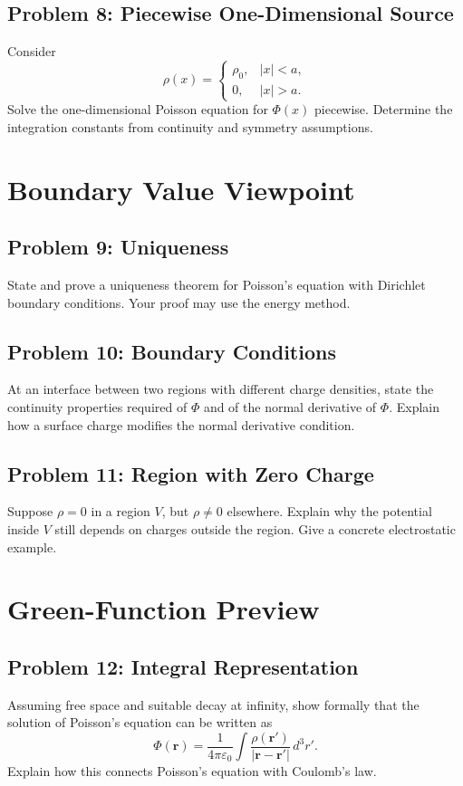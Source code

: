 \documentclass[hidelinks]{article}
\begin{document}
\subsection{Problem 8: Piecewise One-Dimensional Source}
Consider
\[
\rho(x)=
\begin{cases}
\rho_0, & |x|<a,\\
0, & |x|>a.
\end{cases}
\]
Solve the one-dimensional Poisson equation for $\Phi(x)$ piecewise. Determine the integration constants from continuity and symmetry assumptions.

\section{Boundary Value Viewpoint}
\subsection{Problem 9: Uniqueness}
State and prove a uniqueness theorem for Poisson's equation with Dirichlet boundary conditions. Your proof may use the energy method.

\subsection{Problem 10: Boundary Conditions}
At an interface between two regions with different charge densities, state the continuity properties required of $\Phi$ and of the normal derivative of $\Phi$. Explain how a surface charge modifies the normal derivative condition.

\subsection{Problem 11: Region with Zero Charge}
Suppose $\rho=0$ in a region $V$, but $\rho\neq 0$ elsewhere. Explain why the potential inside $V$ still depends on charges outside the region. Give a concrete electrostatic example.

\section{Green-Function Preview}
\subsection{Problem 12: Integral Representation}
Assuming free space and suitable decay at infinity, show formally that the solution of Poisson's equation can be written as
\[
\Phi(\mathbf{r})=\frac{1}{4\pi\varepsilon_0}\int \frac{\rho(\mathbf{r}')}{|\mathbf{r}-\mathbf{r}'|}\,d^3r'.
\]
Explain how this connects Poisson's equation with Coulomb's law.
\end{document}
